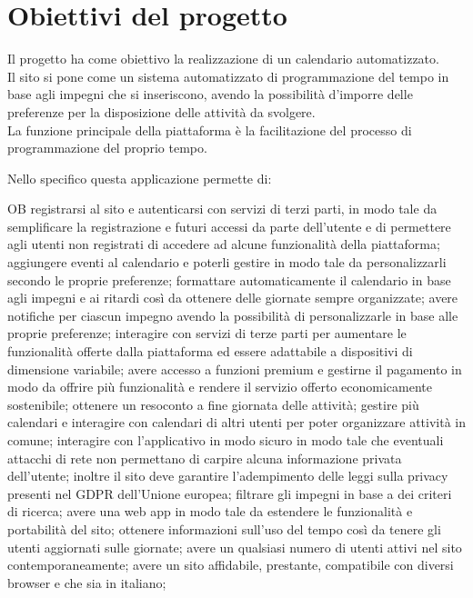 \section{Obiettivi del progetto}
\label{sec:ObiettiviProgetto}
Il progetto ha come obiettivo la realizzazione di un calendario automatizzato.\\
Il sito si pone come un sistema automatizzato di programmazione del tempo in base agli impegni che si inseriscono, avendo la possibilità d'imporre delle preferenze per la disposizione delle attività da svolgere.\\
La funzione principale della piattaforma è la facilitazione del processo di programmazione del proprio tempo.

\vspace{0.5cm}

Nello specifico questa applicazione permette di:
\begin{listaPersonale}{OB}
       registrarsi al sito e autenticarsi con servizi di terzi parti, in modo tale da semplificare la registrazione e futuri accessi da parte dell'utente e di permettere agli utenti non registrati di accedere ad alcune funzionalità della piattaforma;
       aggiungere eventi al calendario e poterli gestire in modo tale da personalizzarli secondo le proprie preferenze;
       formattare automaticamente il calendario in base agli impegni e ai ritardi così da ottenere delle giornate sempre organizzate;
       avere notifiche per ciascun impegno avendo la possibilità di personalizzarle in base alle proprie preferenze;
       interagire con servizi di terze parti per aumentare le funzionalità offerte dalla piattaforma ed essere adattabile a dispositivi di dimensione variabile;
       avere accesso a funzioni premium e gestirne il pagamento in modo da offrire più funzionalità e rendere il servizio offerto economicamente sostenibile;
       ottenere un resoconto a fine giornata delle attività;
       gestire più calendari e interagire con calendari di altri utenti per poter organizzare attività in comune;
       interagire con l'applicativo in modo sicuro in modo tale che eventuali attacchi di rete non permettano di carpire alcuna informazione privata dell'utente; inoltre il sito deve garantire l'adempimento delle leggi sulla privacy presenti nel GDPR dell'Unione europea;
       filtrare gli impegni in base a dei criteri di ricerca;
       avere una web app in modo tale da estendere le funzionalità e portabilità del sito;
       ottenere informazioni sull'uso del tempo così da tenere gli utenti aggiornati sulle giornate;
       avere un qualsiasi numero di utenti attivi nel sito contemporaneamente;
       avere un sito affidabile, prestante, compatibile con diversi browser e che sia in italiano;
\end{listaPersonale}
